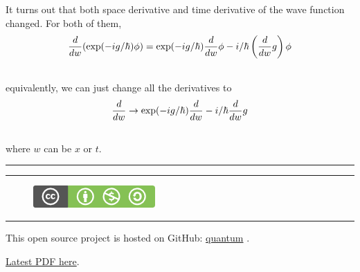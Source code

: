\documentclass[letterpaper,10pt,english]{sphinxmanual}
\begin{document}
It turns out that both space derivative and time derivative of the wave function changed. For both of them,
\begin{gather}
\begin{split}\frac{d}{dw} (\exp(-ig/\hbar)\phi ) = \exp(-ig/\hbar)\frac{d}{dw} \phi - i/\hbar \left(\frac{d}{dw} g\right) \phi\end{split}\notag\\\begin{split}\end{split}\notag
\end{gather}
equivalently, we can just change all the derivatives to
\begin{gather}
\begin{split}\frac{d}{dw} \rightarrow  \exp(-ig/\hbar)\frac{d}{dw} - i/\hbar \frac{d}{dw} g\end{split}\notag\\\begin{split}\end{split}\notag
\end{gather}
where $w$ can be $x$ or $t$.


\bigskip\hrule{}\bigskip



\bigskip\hrule{}\bigskip

\begin{figure}[htbp]
\centering
\href{http://creativecommons.org/licenses/by-nc-sa/3.0/us/}{\includegraphics{cc_byncsa.png}}\end{figure}


\bigskip\hrule{}\bigskip


This open source project is hosted on GitHub: \href{https://github.com/emptymalei/quantum}{quantum} .

\href{https://raw.github.com/emptymalei/quantum/master/Notes/\_build/latex/quantum.pdf}{Latest PDF here}.



\renewcommand{\indexname}{Index}
\printindex
\end{document}
